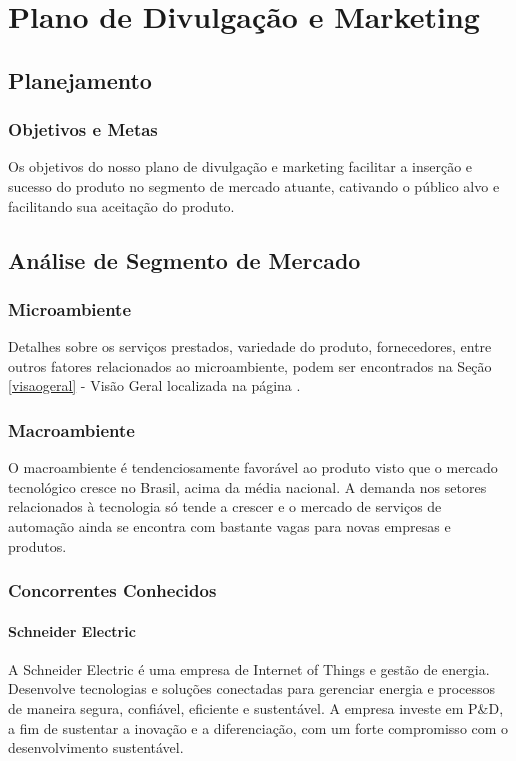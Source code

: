 \chapter{Plano de Divulgação e Marketing}

\section{Planejamento}

\subsection{Objetivos e Metas}
\par Os objetivos do nosso plano de divulgação e marketing facilitar a inserção e sucesso do produto no segmento de mercado atuante, cativando o público alvo e facilitando sua aceitação do produto.

\section{Análise de Segmento de Mercado}

\subsection{Microambiente}
\par Detalhes sobre os serviços prestados, variedade do produto, fornecedores, entre outros fatores relacionados ao microambiente, podem ser encontrados na Seção \ref{visaogeral} - Visão Geral localizada na página \pageref{visaogeral}.

\subsection{Macroambiente}
\par O macroambiente é tendenciosamente favorável ao produto visto que o mercado tecnológico cresce no Brasil, acima da média nacional. A demanda nos setores relacionados à tecnologia só tende a crescer e o mercado de serviços de automação ainda se encontra com bastante vagas para novas empresas e produtos.

\subsection{Concorrentes Conhecidos}

\subsubsection{Schneider Electric}
\par A Schneider Electric é uma empresa de Internet of Things e gestão de energia. Desenvolve tecnologias e soluções conectadas para gerenciar energia e processos de maneira segura, confiável, eficiente e sustentável. A empresa investe em P&D, a fim de sustentar a inovação e a diferenciação, com um forte compromisso com o desenvolvimento sustentável.

